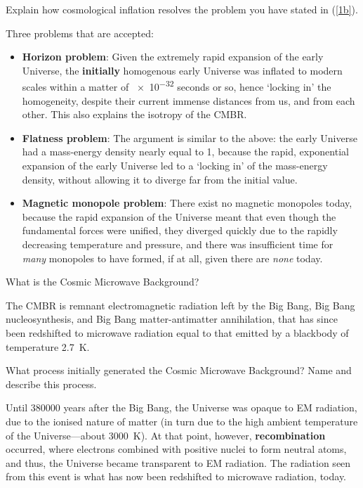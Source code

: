 \documentclass[a4paper,11pt]{exam}
\begin{document}
\begin{questions}
\question[2] 
	Explain how cosmological inflation resolves the problem you have stated in (\ref{1b}).
	\droppoints
	\begin{solution}
		Three problems that are accepted:
		\begin{itemize}[leftmargin=10pt]
			\item \textbf{Horizon problem}: Given the extremely rapid expansion of the early Universe, the \textbf{initially} homogenous early Universe was inflated to modern scales within a matter of \num{e-32} seconds or so, hence `locking in' the homogeneity, despite their current immense distances from us, and from each other. This also explains the isotropy of the CMBR.
			\item \textbf{Flatness problem}: The argument is similar to the above: the early Universe had a mass-energy density nearly equal to 1, because the rapid, exponential expansion of the early Universe led to a `locking in' of the mass-energy density, without allowing it to diverge far from the initial value.
			\item \textbf{Magnetic monopole problem}: There exist no magnetic monopoles today, because the rapid expansion of the Universe meant that even though the fundamental forces were unified, they diverged quickly due to the rapidly decreasing temperature and pressure, and there was insufficient time for \textit{many} monopoles to have formed, if at all, given there are \textit{none} today. 
		\end{itemize}
	\end{solution}

\question[1] 
	What is the Cosmic Microwave Background?
	\droppoints
	\begin{solution}
		The CMBR is remnant electromagnetic radiation left by the Big Bang, Big Bang nucleosynthesis, and Big Bang matter-antimatter annihilation, that has since been redshifted to microwave radiation equal to that emitted by a blackbody of temperature \SI{2.7}{\kelvin}.
	\end{solution}

\question[2] 
	What process initially generated the Cosmic Microwave Background? Name and describe this process.
	\droppoints
	\begin{solution}
		Until \num{380000} years after the Big Bang, the Universe was opaque to EM radiation, due to the ionised nature of matter (in turn due to the high ambient temperature of the Universe---about \SI{3000}{\kelvin}). At that point, however, \textbf{recombination} occurred, where electrons combined with positive nuclei to form neutral atoms, and thus, the Universe became transparent to EM radiation. The radiation seen from this event is what has now been redshifted to microwave radiation, today.
	\end{solution}


\end{questions}
\end{document}
